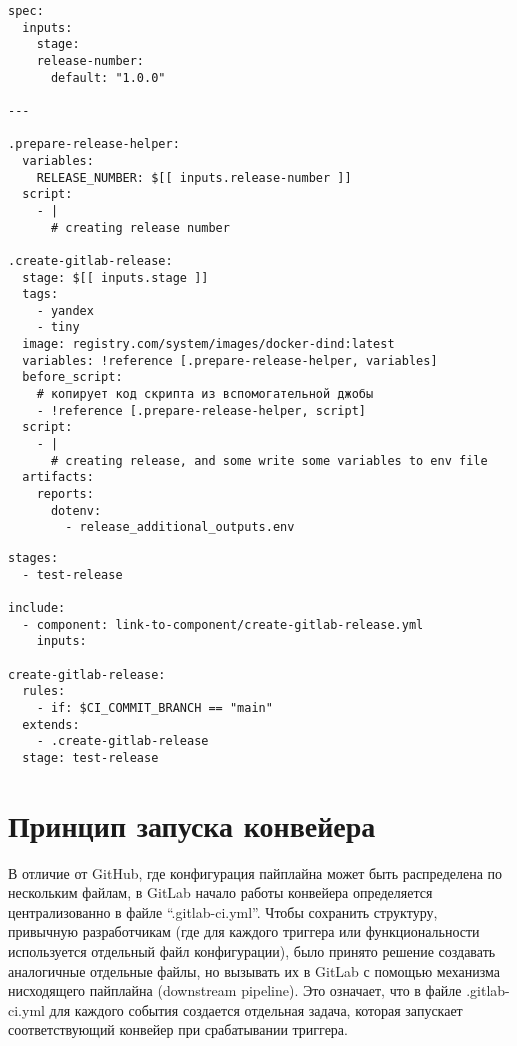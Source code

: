 \newpage %

\begin{verbatim}
spec:
  inputs:
    stage:
    release-number:
      default: "1.0.0"

---

.prepare-release-helper:
  variables:
    RELEASE_NUMBER: $[[ inputs.release-number ]]
  script:
    - |
      # creating release number

.create-gitlab-release:
  stage: $[[ inputs.stage ]]
  tags:
    - yandex
    - tiny
  image: registry.com/system/images/docker-dind:latest
  variables: !reference [.prepare-release-helper, variables]
  before_script:
    # копирует код скрипта из вспомогательной джобы
    - !reference [.prepare-release-helper, script]
  script:
    - |
      # creating release, and some write some variables to env file
  artifacts:
    reports:
      dotenv:
        - release_additional_outputs.env
\end{verbatim}


\newpage %

\begin{verbatim}
stages:
  - test-release

include:
  - component: link-to-component/create-gitlab-release.yml
    inputs:

create-gitlab-release:
  rules:
    - if: $CI_COMMIT_BRANCH == "main"
  extends:
    - .create-gitlab-release
  stage: test-release

\end{verbatim}


\section{Принцип запуска конвейера}
В отличие от GitHub, где конфигурация пайплайна может быть распределена по нескольким файлам, в GitLab начало работы конвейера определяется централизованно в файле \enquote{.gitlab-ci.yml}. Чтобы сохранить структуру, привычную разработчикам (где для каждого триггера или функциональности используется отдельный файл конфигурации), было принято решение создавать аналогичные отдельные файлы, но вызывать их в GitLab с помощью механизма нисходящего пайплайна (downstream pipeline). Это означает, что в файле .gitlab-ci.yml для каждого события создается отдельная задача, которая запускает соответствующий конвейер при срабатывании триггера.

